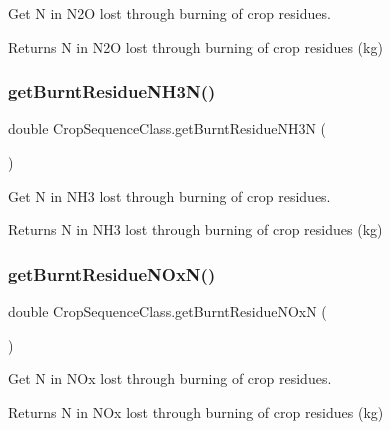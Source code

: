 Get N in N2O lost through burning of crop residues. 

\begin{DoxyReturn}{Returns}
N in N2O lost through burning of crop residues (kg) 
\end{DoxyReturn}
\mbox{\label{class_crop_sequence_class_abd4a4514e94f542705fa48565901094b}} 
\subsubsection{\texorpdfstring{getBurntResidueNH3N()}{getBurntResidueNH3N()}}
{\footnotesize\ttfamily double Crop\+Sequence\+Class.\+get\+Burnt\+Residue\+N\+H3N (\begin{DoxyParamCaption}{ }\end{DoxyParamCaption})\hspace{0.3cm}{\ttfamily [inline]}}



Get N in N\+H3 lost through burning of crop residues. 

\begin{DoxyReturn}{Returns}
N in N\+H3 lost through burning of crop residues (kg) 
\end{DoxyReturn}
\mbox{\label{class_crop_sequence_class_aa4fef8f3d81d98b8e5e6a0a18e67ff8b}} 
\subsubsection{\texorpdfstring{getBurntResidueNOxN()}{getBurntResidueNOxN()}}
{\footnotesize\ttfamily double Crop\+Sequence\+Class.\+get\+Burnt\+Residue\+N\+OxN (\begin{DoxyParamCaption}{ }\end{DoxyParamCaption})\hspace{0.3cm}{\ttfamily [inline]}}



Get N in N\+Ox lost through burning of crop residues. 

\begin{DoxyReturn}{Returns}
N in N\+Ox lost through burning of crop residues (kg) 
\end{DoxyReturn}
\mbox{\label{class_crop_sequence_class_ac1b7b6083a9f81c2c459697b5522f827}} 
